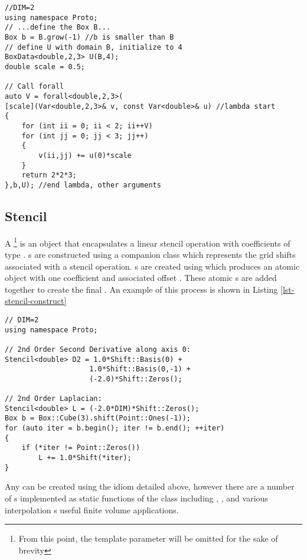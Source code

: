 \documentclass[12pt,a4paper]{article}
\begin{document}
\begin{lstlisting}[caption=Forall Usage With Lambda, label=lst-forall-lambda]
//DIM=2
using namespace Proto;
// ...define the Box B...
Box b = B.grow(-1) //b is smaller than B
// define U with domain B, initialize to 4
BoxData<double,2,3> U(B,4);
double scale = 0.5;

// Call forall
auto V = forall<double,2,3>(
[scale](Var<double,2,3>& v, const Var<double>& u) //lambda start
{
	for (int ii = 0; ii < 2; ii++V)
	for (int jj = 0; jj < 3; jj++)
	{
		v(ii,jj) += u(0)*scale
	}
	return 2*2*3;
},b,U); //end lambda, other arguments

\end{lstlisting}

\subsection{Stencil}

A \footnote{From this point, the template parameter  will be omitted for the sake of brevity} is an object that encapsulates a linear stencil operation with coefficients of type . s are constructed using a companion class  which represents the grid shifts associated with a stencil operation. s are created using  which produces an atomic  object with one coefficient  and associated offset . These atomic s are added together to create the final . An example of this process is shown in Listing \ref{lst-stencil-construct}

\begin{lstlisting}[caption=Stencil Construction, label=lst-stencil-construct]
// DIM=2
using namespace Proto;

// 2nd Order Second Derivative along axis 0:
Stencil<double> D2 = 1.0*Shift::Basis(0) +
					1.0*Shift::Basis(0,-1) +
					(-2.0)*Shift::Zeros();

// 2nd Order Laplacian:
Stencil<double> L = (-2.0*DIM)*Shift::Zeros();
Box b = Box::Cube(3).shift(Point::Ones(-1));
for (auto iter = b.begin(); iter != b.end(); ++iter)
{
	if (*iter != Point::Zeros())
		L += 1.0*Shift(*iter);
}
\end{lstlisting}
Any  can be created using the idiom detailed above, however there are a number of s implemented as static functions of the class  including , , and various interpolation s useful finite volume applications.
\end{document}
